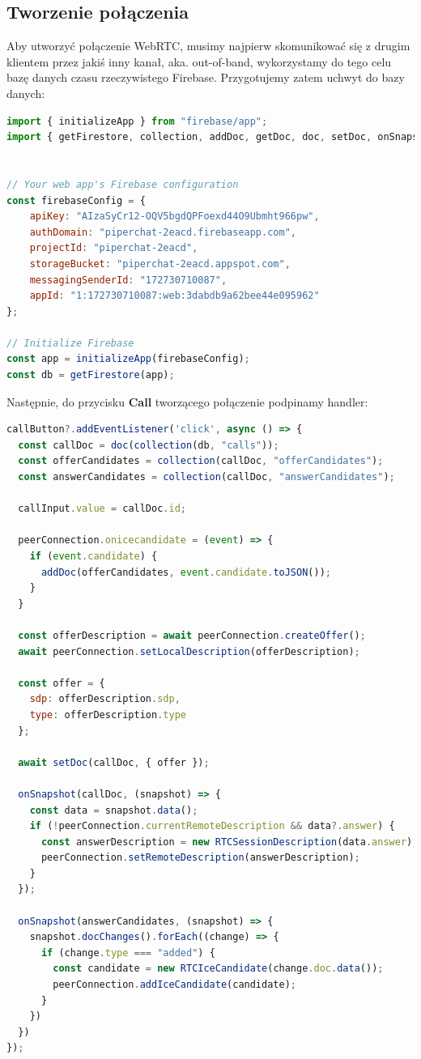 \subsection{Tworzenie połączenia}

Aby utworzyć połączenie WebRTC, musimy najpierw skomunikować się z drugim klientem przez jakiś inny kanał, aka.
out-of-band, wykorzystamy do tego celu bazę danych czasu rzeczywistego Firebase. Przygotujemy zatem uchwyt do bazy
danych:

\begin{lstlisting}[language=Javascript,label=list:firebase-init, caption=Inicjalizacja Firebase,
basicstyle=\footnotesize \ttfamily, showtabs=true, tabsize=4]
import { initializeApp } from "firebase/app";
import { getFirestore, collection, addDoc, getDoc, doc, setDoc, onSnapshot, updateDoc } from "firebase/firestore";


// Your web app's Firebase configuration
const firebaseConfig = {
	apiKey: "AIzaSyCr12-OQV5bgdQPFoexd44O9Ubmht966pw",
	authDomain: "piperchat-2eacd.firebaseapp.com",
	projectId: "piperchat-2eacd",
	storageBucket: "piperchat-2eacd.appspot.com",
	messagingSenderId: "172730710087",
	appId: "1:172730710087:web:3dabdb9a62bee44e095962"
};

// Initialize Firebase
const app = initializeApp(firebaseConfig);
const db = getFirestore(app);
\end{lstlisting}

Następnie, do przycisku \textbf{Call} tworzącego połączenie podpinamy handler:

\begin{lstlisting}[language=Javascript,label=list:call-create, caption=Tworzenie połączenia,
basicstyle=\footnotesize \ttfamily, showtabs=true, tabsize=4]
callButton?.addEventListener('click', async () => {
  const callDoc = doc(collection(db, "calls"));
  const offerCandidates = collection(callDoc, "offerCandidates");
  const answerCandidates = collection(callDoc, "answerCandidates");

  callInput.value = callDoc.id;

  peerConnection.onicecandidate = (event) => {
    if (event.candidate) {
      addDoc(offerCandidates, event.candidate.toJSON());
    }
  }

  const offerDescription = await peerConnection.createOffer();
  await peerConnection.setLocalDescription(offerDescription);

  const offer = {
    sdp: offerDescription.sdp,
    type: offerDescription.type
  };

  await setDoc(callDoc, { offer });

  onSnapshot(callDoc, (snapshot) => {
    const data = snapshot.data();
    if (!peerConnection.currentRemoteDescription && data?.answer) {
      const answerDescription = new RTCSessionDescription(data.answer);
      peerConnection.setRemoteDescription(answerDescription);
    }
  });

  onSnapshot(answerCandidates, (snapshot) => {
    snapshot.docChanges().forEach((change) => {
      if (change.type === "added") {
        const candidate = new RTCIceCandidate(change.doc.data());
        peerConnection.addIceCandidate(candidate);
      }
    })
  })
});
\end{lstlisting}

